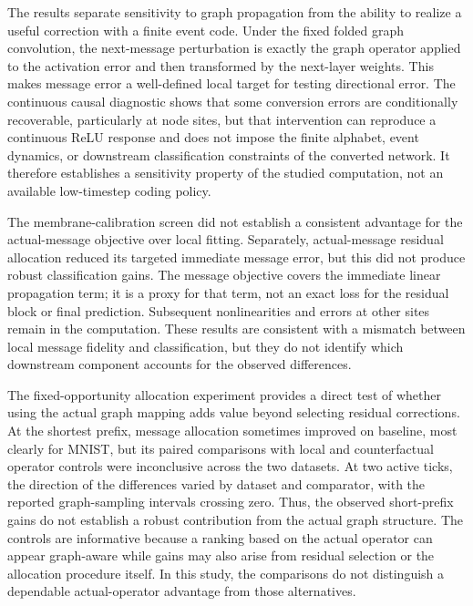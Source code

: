 \documentclass{article}
\begin{document}
\label{sec:discussion}

The results separate sensitivity to graph propagation from the ability to realize a useful correction with a finite event code. Under the fixed folded graph convolution, the next-message perturbation is exactly the graph operator applied to the activation error and then transformed by the next-layer weights. This makes message error a well-defined local target for testing directional error. The continuous causal diagnostic shows that some conversion errors are conditionally recoverable, particularly at node sites, but that intervention can reproduce a continuous ReLU response and does not impose the finite alphabet, event dynamics, or downstream classification constraints of the converted network. It therefore establishes a sensitivity property of the studied computation, not an available low-timestep coding policy.

The membrane-calibration screen did not establish a consistent advantage for the actual-message objective over local fitting. Separately, actual-message residual allocation reduced its targeted immediate message error, but this did not produce robust classification gains. The message objective covers the immediate linear propagation term; it is a proxy for that term, not an exact loss for the residual block or final prediction. Subsequent nonlinearities and errors at other sites remain in the computation. These results are consistent with a mismatch between local message fidelity and classification, but they do not identify which downstream component accounts for the observed differences.

The fixed-opportunity allocation experiment provides a direct test of whether using the actual graph mapping adds value beyond selecting residual corrections. At the shortest prefix, message allocation sometimes improved on baseline, most clearly for MNIST, but its paired comparisons with local and counterfactual operator controls were inconclusive across the two datasets. At two active ticks, the direction of the differences varied by dataset and comparator, with the reported graph-sampling intervals crossing zero. Thus, the observed short-prefix gains do not establish a robust contribution from the actual graph structure. The controls are informative because a ranking based on the actual operator can appear graph-aware while gains may also arise from residual selection or the allocation procedure itself. In this study, the comparisons do not distinguish a dependable actual-operator advantage from those alternatives.
\end{document}
